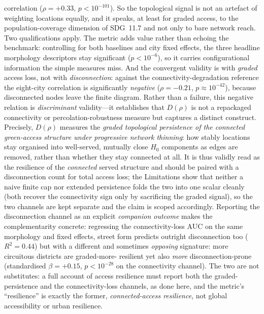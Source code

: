 \documentclass[sn-mathphys-num,pdflatex]{sn-jnl}
\newcommand{\Drho}{D(\rho)}
\begin{document}
correlation ($\rho=+0.33$, $p<10^{-101}$). So the topological signal is not an artefact of weighting locations
equally, and it speaks, at least for graded access, to the population-coverage
dimension of SDG~11.7 and not only to bare network reach. Two qualifications
apply. The metric adds value rather than echoing the benchmark: controlling for
both baselines and city fixed effects, the three headline morphology descriptors
stay significant ($p<10^{-6}$), so it carries configurational information the simple
measures miss. And the convergent validity is with \emph{graded} access loss, not
with \emph{disconnection}: against the connectivity-degradation reference the
eight-city correlation is significantly \emph{negative} ($\rho=-0.21$,
$p\approx10^{-42}$), because disconnected nodes leave the finite diagram. Rather than
a failure, this negative relation is \emph{discriminant} validity---it establishes
that $\Drho$ is not a repackaged connectivity or percolation-robustness measure but
captures a distinct construct. Precisely, $\Drho$ measures the
\emph{graded topological persistence of the connected green-access structure under
progressive network thinning}: how stably locations stay organised into well-served,
mutually close $H_0$ components as edges are removed, rather than whether they stay
connected at all. It is thus validly read as the resilience of the \emph{connected}
served structure and should be paired with a disconnection count for total access
loss; the Limitations show that neither a naive finite cap nor extended persistence
folds the two into one scalar cleanly (both recover the connectivity sign only by
sacrificing the graded signal), so the two channels are kept separate and the claim
is scoped accordingly. Reporting the disconnection channel as an explicit
\emph{companion outcome} makes the complementarity concrete: regressing the
connectivity-loss AUC on the same morphology and fixed effects, street form predicts
outright disconnection too ($R^2=0.44$) but with a different and sometimes
\emph{opposing} signature: more circuitous districts are graded-more-
resilient yet also \emph{more} disconnection-prone (standardised $\beta=+0.15$,
$p<10^{-28}$ on the connectivity channel). The two are not substitutes: a full account
of access resilience must report both the graded-persistence and the connectivity-loss
channels, as done here, and the metric's ``resilience'' is exactly the former,
\emph{connected-access resilience}, not global accessibility or urban resilience.
\end{document}
